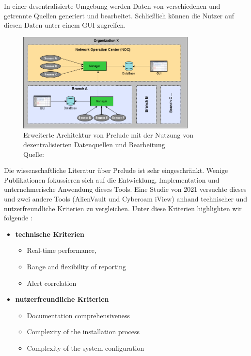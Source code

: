 In einer desentralisierte Umgebung werden Daten von verschiedenen und getrennte Quellen generiert und bearbeitet. Schließlich können die Nutzer auf diesen Daten unter einem \gls{GUI} zugreifen.

\begin{figure}[H]
   \centering
   \includegraphics[width=0.8\textwidth]{assets/2_p5.png}
   \caption{Erweiterte Architektur von Prelude mit der Nutzung von dezentralisierten Datenquellen und Bearbeitung \\Quelle: \citep{Prelude_MU} }
   \centering
\end{figure}

Die wissenschaftliche Literatur über Prelude ist sehr eingeschränkt. Wenige Publikationen fokussieren sich auf die Entwicklung, Implementation und unternehmerische Anwendung dieses Tools. Eine Studie von 2021 versuchte dieses und zwei andere Tools (AlienVault und Cyberoam iView) anhand technischer und nutzerfreundliche Kriterien zu vergleichen. Unter diese Kriterien highlighten wir folgende \citep{Grammatikis_Prelude}:

\begin{itemize}[noitemsep]
   \item \textbf{technische Kriterien}
   \begin{itemize}[noitemsep]
      \item Real-time performance, 
      \item Range and flexibility of reporting
      \item Alert correlation
   \end{itemize}

   \item \textbf{nutzerfreundliche Kriterien}
   \begin{itemize}[noitemsep]
      \item Documentation comprehensiveness
      \item Complexity of the installation process
      \item Complexity of the system configuration
   \end{itemize}
\end{itemize}


